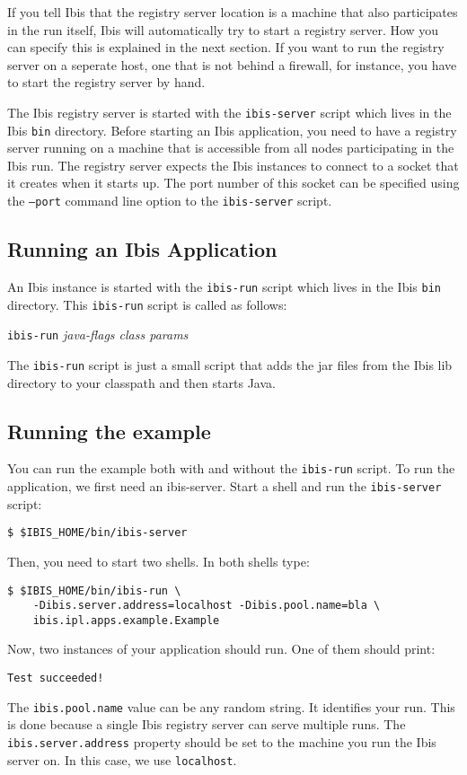 \documentclass[10pt]{article}
\newcommand{\mysubsection}[1]{\subsection{#1}\label{#1}}
\begin{document}
If you tell Ibis that the registry server location is a machine that also
participates in the run itself, Ibis will automatically try to start
a registry server. How you can specify this is explained in the next section.
If you want to run the registry server on a seperate host, one that is not
behind a firewall, for instance, you have to start the registry server by
hand.

The Ibis registry server is started with the \texttt{ibis-server}
script which lives in the Ibis \texttt{bin} directory.
Before starting an Ibis application,
you need to have a registry server running on a machine that is accessible
from all nodes participating in the Ibis run.
The registry server expects the Ibis instances to connect to a
socket that it creates when it starts up.
The port number of this socket can be specified using the
\texttt{--port} command line option to the \texttt{ibis-server} script.

\mysubsection{Running an Ibis Application}

An Ibis instance is started with the \texttt{ibis-run} script which
lives in the Ibis \texttt{bin} directory.  This \texttt{ibis-run}
script is called as follows:
\begin{center}
\texttt{ibis-run} \emph{java-flags class params}
\end{center}
The \texttt{ibis-run} script is just a small script that adds the jar files
from the Ibis lib directory to your classpath and then starts Java.

\mysubsection{Running the example}
You can run the example both with and without the \texttt{ibis-run} script.
To run the application, we first need an ibis-server. Start a shell and
run the \texttt{ibis-server} script:
\noindent
{\small
\begin{verbatim}
$ $IBIS_HOME/bin/ibis-server
\end{verbatim}
}
\noindent

Then, you need to start two shells. In both shells type:

\noindent
{\small
\begin{verbatim}
$ $IBIS_HOME/bin/ibis-run \
    -Dibis.server.address=localhost -Dibis.pool.name=bla \
    ibis.ipl.apps.example.Example
\end{verbatim}
}
\noindent
Now, two instances of your application should run. One of them should print:

\noindent
{\small
\begin{verbatim}
Test succeeded!
\end{verbatim}
}
\noindent
The \texttt{ibis.pool.name} value can be any random string.
It identifies your run.
This is done because a single Ibis registry server can serve multiple
runs.
The \texttt{ibis.server.address} property should
be set to the machine you run the Ibis server on. In this case, we use
\texttt{localhost}.
\end{document}
